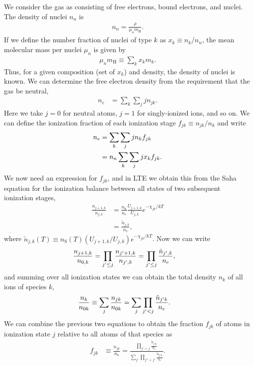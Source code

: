 We consider the gas as consisting of free electrons, bound electrons, and nuclei. The density of
nuclei $n_n$ is
\begin{align}
n_n = \frac{\rho}{\mu_n m_\mathrm{H}}.
\end{align}
If we define the number fraction of nuclei of type $k$ as $x_k \equiv
n_k / n_n$, the mean molecular mass per nuclei $\mu_n$ is given by
\begin{align}
\mu_n m_\mathrm{H} \equiv \sum_k x_k m_k.
\end{align}
Thus, for a given composition (set of $x_k$) and density, the density of
nuclei is known.
We can determine the free electron density from the requirement that the gas
be neutral, 
\begin{align}
n_e &= \sum_{k} \sum_{j} j n_{jk}.
\end{align}
Here we take $j= 0$ for neutral atoms, $j=1$ for singly-ionized ions,
and so on. We can define the ionization fraction of each ionization
stage $f_{jk} \equiv n_{jk} / n_k$ and write
\begin{align}
n_e
&= \sum_{k} \sum_{j} j n_k f_{jk}\\
&= n_n \sum_{k} \sum_{j} j x_k f_{jk}.
\eqlabel{neutrality}
\end{align}
We now need an expression for $f_{jk}$, and in LTE we obtain this from
the Saha equation for the ionization balance between all states of two
subsequent ionization stages,
\begin{align}
\frac{n_{j+1,k}}{n_{j,k}}
&=
\frac{n_\mathrm{S}}{n_e}
\frac{U_{j+1,k}}{U_{j,k}} 
e^{-\chi_{jk}/kT}\\
&= \frac{\tilde n_{j,k}}{n_e},
\end{align}
where $\tilde n_{j,k}(T) \equiv n_\mathrm{S}(T)
(U_{j+1,k}/U_{j,k})e^{-\chi_{jk}/kT}$. Now we can write
\begin{align}
\frac{n_{j+1,k}}{n_{0,k}}&=  \prod_{j'\le j}
\frac{n_{j'+1,k}}{n_{j',k}}
= \prod_{j'\le j} \frac{\tilde n_{j',k}}{n_e},
\eqlabel{saha-n-jk}
\end{align}
and summing over all ionization states we can obtain the total density
$n_k$ of all ions of species $k$,
\begin{align}
\frac{n_k}{n_{0k}} &\equiv \sum_{j} \frac{n_{jk}}{n_{0k}} =
\sum_{j} \prod_{ j'< j}
\frac{\tilde n_{j'k}}{n_e}.\eqlabel{saha-n-k}
\end{align}
We can combine the previous two equations
to obtain the fraction $f_{jk}$ of atoms in
ionization state $j$ relative to all atoms of that species as
\begin{align}
f_{jk} &\equiv \frac{n_{jk}}{n_k}
= \frac{\prod_{j' < j} 
\frac{\tilde n_{j'k}}{n_e}}{\sum_{j'}\prod_{j'' < j'} \frac{\tilde n_{j''
k}}{n_e}}.
\end{align}
